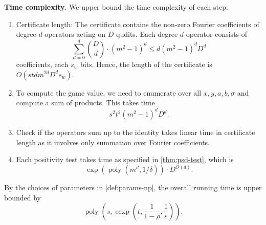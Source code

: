 \documentclass[10pt,a4paper]{article}
\theoremstyle{plain}
\theoremstyle{definition}
\newcommand {\br} [1] {\ensuremath{ \left( #1 \right) }}
\newcommand{\poly} {\ensuremath{\operatorname{poly}}}
\newcommand{\ep} {\ensuremath{\varepsilon}}
\newcommand{\dlbo} {\ensuremath{{D}}}
\newcommand{\dldd} {\ensuremath{{d}}}
\newcommand{\wireal} {\ensuremath{{s_{w}}}}
\newcommand{\1}{\mathbb{1}} %
\begin{document}
\textbf{Time complexity}.
We upper bound the time complexity of each step.
\begin{enumerate}
  \item Certificate length: The certificate contains the non-zero Fourier coefficients of degree-$\dldd$ operators acting on $\dlbo$ qudits.
        Each degree-$\dldd$ operator consists of
        $$\sum_{d=0}^{\dldd}{\binom{\dlbo}{d} }\cdot (m^2-1)^{d} \le \dldd(m^2-1)^\dldd\dlbo^\dldd$$
coefficients, each $\wireal$ bits. Hence, the length of the certificate is $O(st\dldd m^{2\dldd}\dlbo^\dldd\wireal)$.
  \item To compute the game value, we need to enumerate over all $x, y, a, b, \sigma$ and compute a sum of products.
        This takes time
        $$s^2t^2(m^2-1)^dD^d.$$
  \item Check if the operators sum up to the identity takes linear time in            certificate length as it involves only summation over Fourier coefficients.
  \item Each positivity test takes time as specified in \cref{thm:psd-test}, which is
        $$\exp\br{\poly\br{m^d, 1/\delta}}\cdot D^{O(d)}.$$
\end{enumerate}
By the choices of parameters in \cref{def:params-np}, the overall running time is  upper bounded by
$$\poly\br{s, \operatorname{eexp}\br{t, \frac{1}{1-\rho}, \frac{1}{\ep}}}.$$
\end{document}
